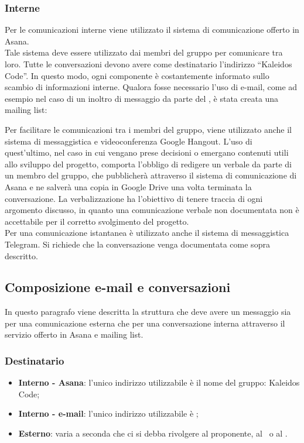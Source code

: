 \documentclass[../NormeDiProgetto.tex]{subfiles}
\begin{document}
			\subsubsection{Interne}
				Per le comunicazioni interne viene utilizzato il sistema di
				comunicazione offerto in Asana.\\
				Tale sistema deve essere utilizzato dai membri del gruppo
				per comunicare tra loro. Tutte le conversazioni devono avere
				come destinatario l'indirizzo ``Kaleidos Code''.
				In questo modo, ogni componente è costantemente informato sullo
				scambio di informazioni interne.
				Qualora fosse necessario l'uso di e-mail, come ad esempio nel caso di
				un inoltro di messaggio da parte del \responsabilediprogetto, è stata creata una mailing list:
				\begin{center}
					\mailinglist
				\end{center}
				Per facilitare le comunicazioni tra i membri del gruppo, viene
				utilizzato anche il sistema di messaggistica e videoconferenza
				Google Hangout.
				L'uso di quest'ultimo, nel caso in cui
				vengano prese decisioni	o emergano contenuti utili allo
				sviluppo del progetto, comporta l'obbligo di redigere un verbale
				da parte di un membro del gruppo, che pubblicherà attraverso il sistema
				di comunicazione di Asana e ne salverà una copia in Google Drive una volta
				terminata la conversazione. La verbalizzazione ha l'obiettivo di tenere
				traccia di ogni argomento discusso, in
				quanto una comunicazione verbale non documentata non è
				accettabile per il corretto svolgimento del progetto.\\
				Per una comunicazione istantanea è utilizzato anche il sistema
				di messaggistica Telegram. Si richiede che la conversazione
				venga documentata come sopra descritto.
			\subsection{Composizione e-mail e conversazioni}
				In questo paragrafo viene descritta la struttura che deve avere
				un messaggio sia per una comunicazione esterna che per una
				conversazione interna attraverso il servizio offerto in Asana e
				mailing list.
				\subsubsection{Destinatario}
					\begin{itemize}
						\item \textbf{Interno - Asana}: l'unico indirizzo utilizzabile è
						il nome del gruppo: Kaleidos Code;
						\item \textbf{Interno - e-mail}: l'unico indirizzo utilizzabile è
						\mailkaleidoscode;
						\item \textbf{Esterno}: varia a seconda che ci si debba
						rivolgere  al proponente, al \vardanega\ o al \cardin.
					\end{itemize}
\end{document}
